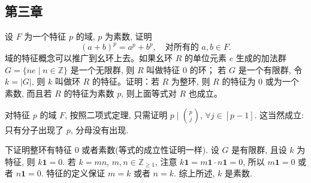 \subsection{第三章}
\setcounter{pb}{5}
\begin{problem}
    设 $ F $ 为一个特征 $ p $ 的域, $ p $ 为素数, 证明
    \[
    (a+b)^p = a^p + b^p, \quad \text{对所有的 } a,b \in F.
    \]
    域的特征概念可以推广到幺环上去。如果幺环 $ R $ 的单位元素 $ e $ 生成的加法群 
$G = \{ ne \mid n \in \mathbb{Z} \} $ 是一个无限群, 则 $ R $ 叫做特征 $ 0 $ 的环；
若 $ G $ 是一个有限群, 令 $ k = |G| $, 则 $ k $ 叫做环 $ R $ 的特征。证明：若 $ R $ 为整环, 则 $ R $ 的特征为 $ 0 $ 或为一个素数, 
而且若 $ R $ 的特征为素数 $ p $, 则上面等式对 $ R $ 也成立。

\end{problem}

\begin{solution}
    对特征 $p$ 的域 $F$, 按照二项式定理, 只需证明 $p\mid\binom{p}{j}$, $\forall j\in[p-1]$. 
    这当然成立: 只有分子出现了 $p$, 分母没有出现. 
    \par 下证明整环有特征 $0$ 或者素数(等式的成立性证明一样). 
    设 $G$ 是有限群, 且设 $k$ 为特征, 则 $k \mathbf{1}=0$. 若 $k=m n$, $m,n\in \mathbb{Z}_{\geq1}$, 注意 $k \mathbf{1}=m \mathbf{1}\cdot n \mathbf{1}=0$, 
    所以 $m \mathbf{1}=0$ 或者 $n \mathbf{1}=0$. 特征的定义保证 $m=k$ 或者 $n=k$. 综上所述, $k$ 是素数.
\end{solution}





